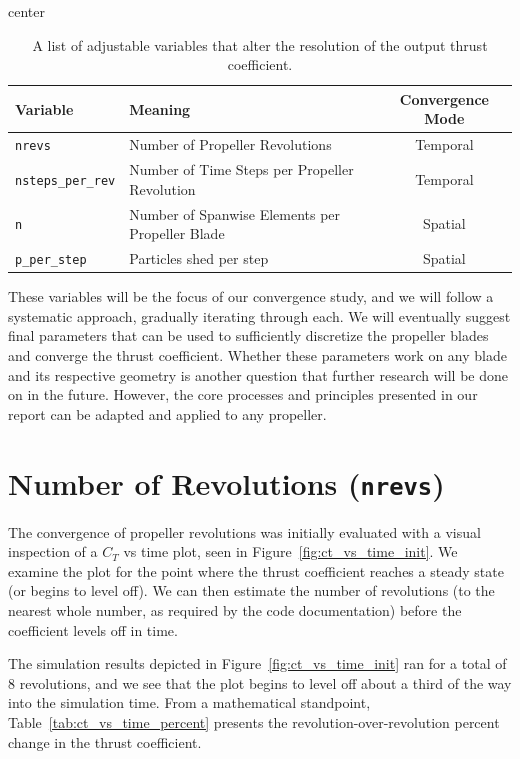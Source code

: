 \documentclass{report}
\begin{document}
\begin{table}[H]
    \centering
    \caption{A list of adjustable variables that alter the resolution of the output thrust coefficient.}\label{tab:adjustables_rotor}
    \begin{adjustbox}{center}
    \begin{tabular}{l l c}
        \toprule
        \textbf{Variable} & \textbf{Meaning} & \textbf{Convergence Mode} \\
        \midrule
        \texttt{nrevs} & Number of Propeller Revolutions & Temporal \\
        \texttt{nsteps\_per\_rev} & Number of Time Steps per Propeller Revolution & Temporal \\
        \texttt{n} & Number of Spanwise Elements per Propeller Blade & Spatial \\
        \texttt{p\_per\_step} & Particles shed per step & Spatial \\
        \bottomrule
    \end{tabular}
    \end{adjustbox}
\end{table}

These variables will be the focus of our convergence study, and we will follow a systematic approach, gradually iterating through each. We will eventually suggest final parameters that can be used to sufficiently discretize the propeller blades and converge the thrust coefficient. Whether these parameters work on any blade and its respective geometry is another question that further research will be done on in the future. However, the core processes and principles presented in our report can be adapted and applied to any propeller.

\section{Number of Revolutions (\texttt{nrevs})}
The convergence of propeller revolutions was initially evaluated with a visual inspection of a $C_T$ vs time plot, seen in Figure~\ref{fig:ct_vs_time_init}.
We examine the plot for the point where the thrust coefficient reaches a steady state (or begins to level off). We can then estimate the number of revolutions (to the nearest whole number, as required by the code documentation) before the coefficient levels off in time.

The simulation results depicted in Figure~\ref{fig:ct_vs_time_init} ran for a total of 8 revolutions, and we see that the plot begins to level off about a third of the way into the simulation time. From a mathematical standpoint, Table~\ref{tab:ct_vs_time_percent} presents the revolution-over-revolution percent change in the thrust coefficient.
\end{document}
